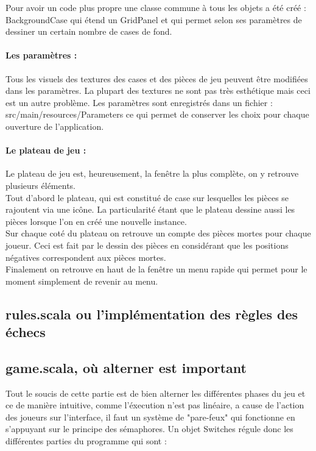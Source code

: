 \documentclass[a4paper]{article}
\begin{document}
Pour avoir un code plus propre une classe commune à tous les objets a été créé : BackgroundCase qui étend un GridPanel et qui permet selon ses paramètres de dessiner un certain nombre de cases de fond. 

\paragraph{Les paramètres :}Tous les visuels des textures des cases et des pièces de jeu peuvent être modifiées dans les paramètres. La plupart des textures ne sont pas très esthétique mais ceci est un autre problème. Les paramètres sont enregistrés dans un fichier : src/main/resources/Parameters ce qui permet de conserver les choix pour chaque ouverture de l'application. 

\paragraph{Le plateau de jeu :}Le plateau de jeu est, heureusement, la fenêtre la plus complète, on y retrouve plusieurs éléments. \\

Tout d'abord le plateau, qui est constitué de case sur lesquelles les pièces se rajoutent via une icône. La particularité étant que le plateau dessine aussi les pièces lorsque l'on en créé une nouvelle instance. \\

Sur chaque coté du plateau on retrouve un compte des pièces mortes pour chaque joueur. Ceci est fait par le dessin des pièces en considérant que les positions négatives correspondent aux pièces mortes. \\

Finalement on retrouve en haut de la fenêtre un menu rapide qui permet pour le moment simplement de revenir au menu. 

\subsection{rules.scala ou l'implémentation des règles des échecs}

\subsection{game.scala, où alterner est important}

Tout le soucis de cette partie est de bien alterner les différentes phases du jeu et ce de manière intuitive, comme l'éxecution n'est pas linéaire, a cause de l'action des joueurs sur l'interface, il faut un système de "pare-feux" qui fonctionne en s'appuyant sur le principe des sémaphores. Un objet Switches régule donc les différentes parties du programme qui sont  : \\
\end{document}
